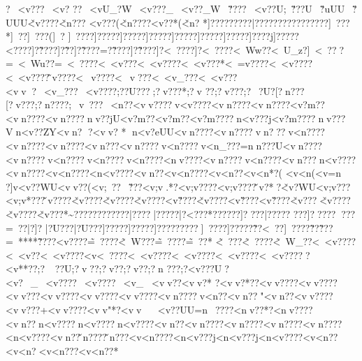{{{{{{{{{{{{{{{{{{{{{{{{{{{{{{{{{{{{{{{{{{{{{{{{{{{{{{{{{{{{{{{{{{{{{{{{{{{{{{{{{{{{{{{{{{{{{{{{{{{{{{{{{{{{{{{{{{{{{{{{{{{{{{{{{{{{{{{{{{{{{{{{{{{{{{{{{{{{{{{{{{{{{{{{{{{{{{{{{{{{{{{{{{{{{{{{{{{{{{{{{{{{{{{{{{{{{{{{{{{{{{{{{{{{{{{{{{{{{{{{{{{{{{{{{{{{{{{{{{{{{{{{{{{{{{{{{{{{{{{{{{{{{{{{{{{{{{{{{{{{{{{{{{{{{{{{{{{{{{{{{{{{{{{{{{{{{{{{{{{{{{{{{{{{{{{{{{{{{{{{{{{{{{{{{{{{{{{{{{{{{{{{{{{{{{{{{{{{{{{{{{{{{{{{{{{{{{{{{{{{{{{{{{{{{{{{{{{{{{{{{{{{{{{{{{{{{{{{{{{{{{{{{{{{{{{{?~<v? ??~<v?
??~<vU_?W~<v???_~<v??_W~\v????~<v??}U;~\v???U~\v?uUU~\v?UUU\v<v????\v<n???
<v\n???(\v<n????<v\n??*(\v<n?
*]?\?????\?\?????|?\?????\?\?????\?\?????\?\????\?]~???*\?]~??\?]~???(\?]~? \?]~????]?\?????]?\?????]?\?????\?]?????\?]?????\?]?????\?]????j\?]?????\?<???? ]?\~????]?\~??]?\~????=?\~????]?\~????]?<~????]?<~????\?<~Ww??\?<~U_z?]~<~???=~<~Wu??=~<~????<~<v?? ?<~<v????<~<v???*<~=v????<~<v????<~<v????\~v????<~v????<~v???<~<v_???<~<v}???<vv? ~<v_???~<v????;??U???;?v???*;?v
?? ;?v ???;?~ ?U?[?n ???[?v ???;?n????;~v~???~<n??<vv????v<v????<vn????<vn????<v?m??<vn????<vn????nv??jU<v?m??<v?m??<v?m????n<v???j<v?m????nv???Vn<v??ZY<vn?
?<vv?
*
n<v?eUU<vn????<vn????vn???v<n????<vn????<vn????<vn???<vn????v<n????v<n_???=nn???U<vn????<vn????v<n????v<n????v<n????<nv????<vn????v<n????<vn???n<v????<vn????<v<n????<n<v????<vn??<v<n????<v<n?? <v<n*?( <v<n   (<v=n ?  ]v<v??WU<vv ??(<v;~ ?? ~\v???<v;v.*?<v;v????<v;v????\vv?*?\v<v}?WU<v;v???<v;v*???\vv????\v<v????\v<v????\v<v????<v\v????\v<v????<v\v????<v\v????\v<v???\v<v????\v<v????\v<v???*\~\vUU??}?\?????}?\?????|?\????|?\?????|?<???*?}?\?????]?\????|?\?????\?\?
???]?\????\?\?? \?\??? ?\?=~??  |?\?]?
|?\?U???|?\?U???]?\?????]?\?????]?\?????}?\????\?]~????]?\?????\?\~??\?<~??\?]~????\?\~??\?\~???\?=~****\?\~????\?<v????\~=~????\~<~W???\~=~????\~=~??*
\~<~???\~<~????\~<~W_??<~<v????<~<v??<~<v????<v<~????<~<v????<~<v????<~<v????<~<v?????<v**??;?~??U;?v ??;?v  ??;?v  ??;?n
???;?<v???U?<v?~_~<v????~<v????~<v_<vv??<vv?*
?<vv?*??<vv????<vv????<vv???<vv????<vv????<vv????<vn????v<n??<vn??"<vn??  <vv????<vv???+<vv????<vv "*?<vv 
~<v??UU=n~????<nv??*?<nv????<vn??n<v????n<v????n<v????<vn??<vn????<vn????<vn????<vn????<n<v????<vn??\vn????\vn???<v<n????<n<v???j<n<v???j<n<v????<v<n??<v<n?<v<n??? <v<n??*
}}}}}}}}}}}}}}}}}}}}}}}}}}}}}}}}}}}}}}}}}}}}}}}}}}}}}}}}}}}}}}}}}}}}}}}}}}}}}}}}}}}}}}}}}}}}}}}}}}}}}}}}}}}}}}}}}}}}}}}}}}}}}}}}}}}}}}}}}}}}}}}}}}}}}}}}}}}}}}}}}}}}}}}}}}}}}}}}}}}}}}}}}}}}}}}}}}}}}}}}}}}}}}}}}}}}}}}}}}}}}}}}}}}}}}}}}}}}}}}}}}}}}}}}}}}}}}}}}}}}}}}}}}}}}}}}}}}}}}}}}}}}}}}}}}}}}}}}}}}}}}}}}}}}}}}}}}}}}}}}}}}}}}}}}}}}}}}}}}}}}}}}}}}}}}}}}}}}}}}}}}}}}}}}}}}}}}}}}}}}}}}}}}}}}}}}}}}}}}}}}}}}}}}}}}}}}}}}}}}}}}}}}}}}}}}}}}}}}}}}}}}}}}}}}}}}}}}}}}}}}}}}}
